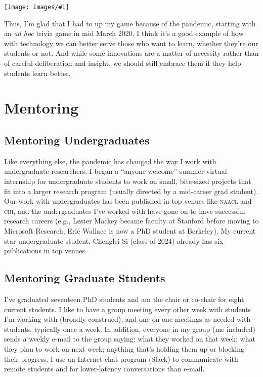 \documentclass[11pt]{amsart}
\newcommand{\abr}[1]{\textsc{#1}}
\newcommand{\image}[2]{  \begin{center}
\texttt{[image: images/\#1]}
\end{center}
  }
\begin{document}
\image{atlanta_hsnct}{}

Thus, I'm glad that I had to up my game because of the pandemic,
starting with an \textit{ad hoc} trivia game in mid March 2020.  I
think it's a good example of how with technology we can better serve
those who want to learn, whether they're our students or not.  And
while some innovations are a matter of necessity rather than of
careful deliberation and insight, we should still embrace them if they
help students learn better.

\section{Mentoring}

\subsection{Mentoring Undergraduates}

Like everything else, the pandemic has changed the way I work with
undergraduate researchers.
%
I began a ``anyone welcome'' summer virtual internship for
undergraduate students to work on small, bite-sized projects that fit
into a larger research program (usually directed by a mid-career grad
student).
%
Our work with undergraduates has been published in top venues like
\abr{naacl} and \abr{chi}, and the undergraduates I've worked with
have gone on to have successful research careers (e.g., Lester Mackey
became faculty at Stanford before moving to Microsoft Research, Eric
Wallace is now a PhD student at Berkeley).
%
My current star undergraduate student, Chenglei Si (class of 2024) already
has six publications in top venues.

\subsection{Mentoring Graduate Students}

I've graduated seventeen PhD students and am the chair or co-chair for
eight current students.  I like to have a group meeting every other
week with students I'm working with (broadly construed), and
one-on-one meetings as needed with students, typically once a week. In
addition, everyone in my group (me included) sends a weekly e-mail to
the group saying: what they worked on that week; what they plan to work
on next week; anything that's holding them up or blocking their
progress. I use an Internet chat program (Slack) to communicate with remote
students and for lower-latency conversations than e-mail.
\end{document}
